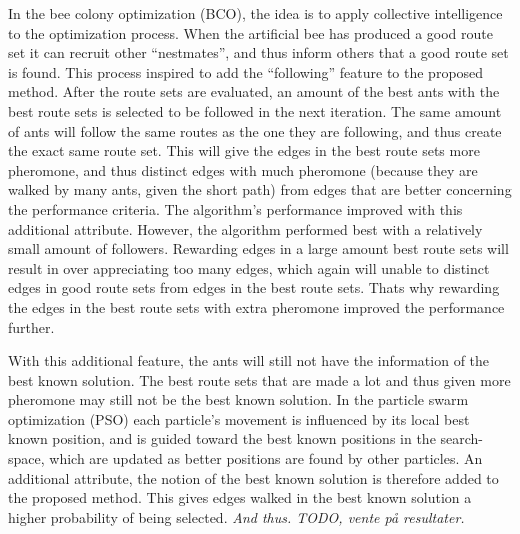 In the bee colony optimization (BCO), the idea is to apply collective intelligence to the optimization process. When the artificial bee has produced a good route set it can recruit other ``nestmates'', and thus inform others that a good route set is found. This process inspired to add the ``following'' feature to the proposed method. After the route sets are evaluated, an amount of the best ants with the best route sets is selected to be followed in the next iteration. The same amount of ants will follow the same routes as the one they are following, and thus create the exact same route set. This will give the edges in the best route sets more pheromone, and thus distinct edges with much pheromone (because they are walked by many ants, given the short path) from edges that are better concerning the performance criteria. The algorithm's performance improved with this additional attribute. However, the algorithm performed best with a relatively small amount of followers. Rewarding edges in a large amount best route sets will result in over appreciating too many edges, which again will unable to distinct edges in good route sets from edges in the best route sets. Thats why rewarding the edges in the best route sets with extra pheromone improved the performance further.  %


With this additional feature, the ants will still not have the information of the best known solution. The best route sets that are made a lot and thus given more pheromone may still not be the best known solution. In the particle swarm optimization (PSO) each particle's movement is influenced by its local best known position, and is guided toward the best known positions in the search-space, which are updated as better positions are found by other particles. An additional attribute, the notion of the best known solution is therefore added to the proposed method. This gives edges walked in the best known solution a higher probability of being selected. \emph{\color{blue} And thus. TODO, vente på resultater.}

